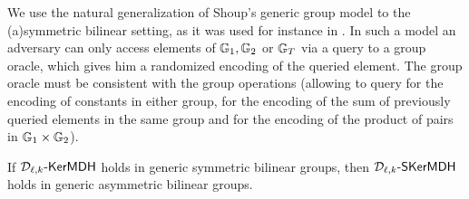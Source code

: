 We use the natural generalization of Shoup's generic group model \cite{EC:Shoup97} to the (a)symmetric bilinear setting, as it was used for instance in \cite{EC:BonBoyGoh05}. In such a model an adversary can only access elements of $\mathbb{G}_1,\mathbb{G}_2$ or $\mathbb{G}_T$ via a query to a group oracle, which gives him a randomized  encoding of the queried element. The group oracle must be consistent with the group operations (allowing to query for the encoding of constants in either group, for the encoding of the sum of previously queried elements in the same group and for the encoding of the product of pairs in $\mathbb{G}_1\times \mathbb{G}_2$). %

\begin{lemma} If $\mathcal{D}_{\ell,k}\mbox{-}\mathsf{KerMDH}$ holds in generic symmetric bilinear groups, then $\mathcal{D}_{\ell,k}\mbox{-}\mathsf{SKerMDH}$ holds in generic asymmetric bilinear groups. 
\end{lemma}

